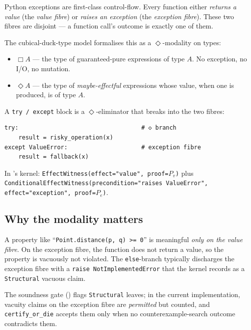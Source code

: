 Python exceptions are first-class control-flow.  Every function
either \emph{returns a value} (the \emph{value fibre}) or \emph{raises
an exception} (the \emph{exception fibre}).  These two fibres are
disjoint --- a function call's outcome is exactly one of them.

The cubical-duck-type model formalises this as a $\Diamond$-modality
on types:
\begin{itemize}[leftmargin=1.7em]
  \item $\Box A$ --- the type of guaranteed-pure expressions of type
    $A$.  No exception, no I/O, no mutation.
  \item $\Diamond A$ --- the type of \emph{maybe-effectful}
    expressions whose value, when one is produced, is of type $A$.
\end{itemize}

A \texttt{try / except} block is a $\Diamond$-eliminator that breaks
into the two fibres:

\begin{lstlisting}[language=psdl, caption={\texttt{try / except} as
$\Diamond$-elimination.}]
try:                                   # ◇ branch
    result = risky_operation(x)
except ValueError:                     # exception fibre
    result = fallback(x)
\end{lstlisting}

In \Deppy{}'s kernel: \texttt{EffectWitness(effect="value", proof=$P_v$)}
plus \texttt{ConditionalEffectWitness(precondition="raises ValueError",
effect="exception", proof=$P_e$)}.

\subsection{Why the modality matters}

A property like ``\texttt{Point.distance(p, q) >= 0}'' is meaningful
\emph{only on the value fibre}.  On the exception fibre, the function
does not return a value, so the property is vacuously not violated.
The \PSDL{} \texttt{else}-branch typically discharges the exception
fibre with a \texttt{raise NotImplementedError} that the kernel
records as a \texttt{Structural} vacuous claim.

The soundness gate () flags \texttt{Structural}
leaves; in the current implementation, vacuity claims on the
exception fibre are \emph{permitted} but counted, and
\texttt{certify\_or\_die} accepts them only when no
counterexample-search outcome contradicts them.

